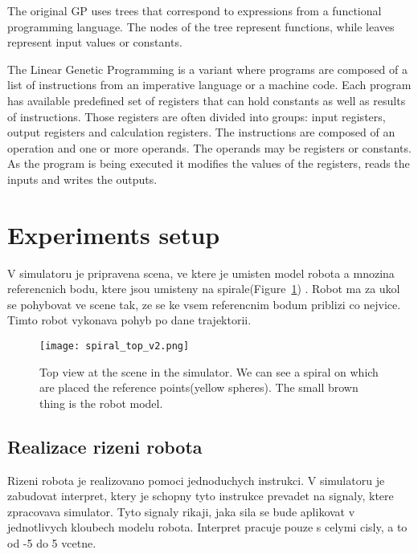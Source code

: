 \documentclass{ExcelAtFIT}
\begin{document}
The original GP uses trees that correspond to expressions from a functional programming language.
The nodes of the tree represent functions, while leaves represent input values or constants.

The Linear Genetic Programming is a variant where programs are composed of a list of instructions from an imperative language or a machine code.
Each program has available predefined set of registers that can hold constants as well as results of instructions.
Those registers are often divided into groups: input registers, output registers and calculation registers.
The instructions are composed of an operation and one or more operands.
The operands may be registers or constants.
As the program is being executed it modifies the values of the registers, reads the inputs and writes the outputs.


\section{Experiments setup}
\label{sec:ExperimentsSetup}

V simulatoru je pripravena scena, ve ktere je umisten model robota a mnozina referencnich bodu, ktere jsou umisteny na spirale(Figure~\ref{fig:SpiralTop}) .
Robot ma za ukol se pohybovat ve scene tak, ze se ke vsem referencnim bodum priblizi co nejvice.
Timto robot vykonava pohyb po dane trajektorii.

\begin{figure}[t]
\centering
{\texttt{[image: spiral\_top\_v2.png]}}
\caption{Top view at the scene in the simulator.
We can see a spiral on which are placed the reference points(yellow spheres).
The small brown thing is the robot model.}
\label{fig:SpiralTop}
\end{figure}


\subsection{Realizace rizeni robota}
Rizeni robota je realizovano pomoci jednoduchych instrukci.
V simulatoru je zabudovat interpret, ktery je schopny tyto instrukce prevadet na signaly, ktere zpracovava simulator.
Tyto signaly rikaji, jaka sila se bude aplikovat v jednotlivych kloubech modelu robota.
Interpret pracuje pouze s celymi cisly, a to od -5 do 5 vcetne.
\end{document}
